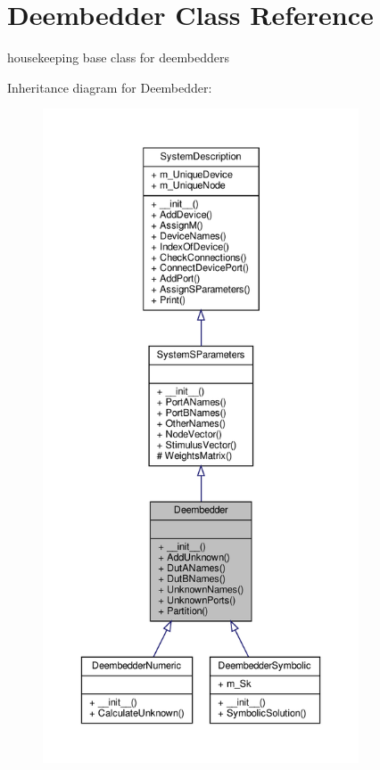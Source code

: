 \hypertarget{classSignalIntegrity_1_1SystemDescriptions_1_1Deembedder_1_1Deembedder}{}\section{Deembedder Class Reference}
\label{classSignalIntegrity_1_1SystemDescriptions_1_1Deembedder_1_1Deembedder}


housekeeping base class for deembedders  




Inheritance diagram for Deembedder\+:
\nopagebreak
\begin{figure}[H]
\begin{center}
\leavevmode
\includegraphics[height=550pt]{classSignalIntegrity_1_1SystemDescriptions_1_1Deembedder_1_1Deembedder__inherit__graph}
\end{center}
\end{figure}


